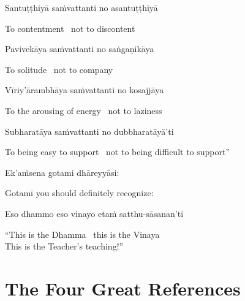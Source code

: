 Santuṭṭhiyā saṁvattanti no asantuṭṭhiyā

\begin{english}
  To contentment \breathmark\ not to discontent
\end{english}

Pavivekāya saṁvattanti no saṅgaṇikāya

\begin{english}
  To solitude \breathmark\ not to company
\end{english}

Vīriy'ārambhāya saṁvattanti no kosajjāya

\begin{english}
  To the arousing of energy \breathmark\ not to laziness
\end{english}

\ifninebythirteen\clearpage\fi

Subharatāya saṁvattanti no dubbharatāyā'ti

\begin{english-hang}
  To being easy to support \breathmark\ not to being difficult to support''
\end{english-hang}

Ek'aṁsena gotami dhāreyyāsi:

\begin{english}
  Gotamī\makeatletter\hyperlink{endnote85-appendix}\makeatother \thinspace
  you should definitely recognize:
\end{english}

Eso dhammo eso vinayo etaṁ satthu-sāsanan'ti

\begin{english}
  ``This is the Dhamma \breathmark\ this is the Vinaya\\
  This is the Teacher's teaching!''
\end{english}

\ifninebythirteen\vspace{-1em}\fi

\suttaRef{[AN 8.53]}

\ifdigital{}\fi



\section{The Four Great References}
\label{four-great-references}

